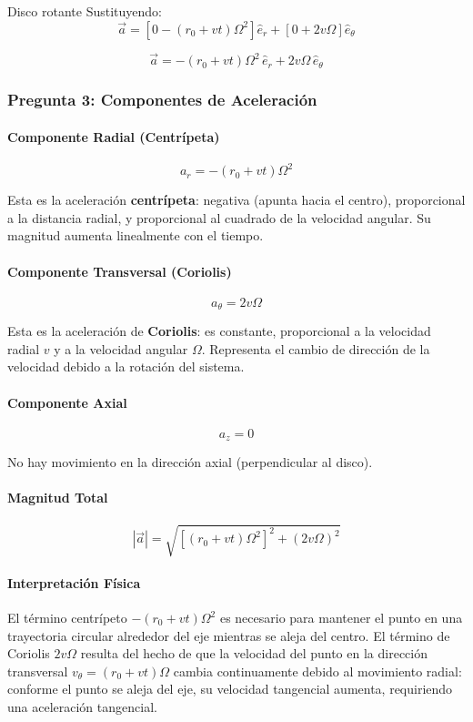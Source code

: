 \begin{solucion}{Disco rotante}
Sustituyendo:
\begin{equation}
\vec{a} = [0 - (r_0 + vt)\Omega^2] \hat{e}_r + [0 + 2v\Omega] \hat{e}_\theta
\end{equation}

\begin{equation}
\boxed{\vec{a} = -(r_0 + vt) \Omega^2 \, \hat{e}_r + 2v\Omega \, \hat{e}_\theta}
\end{equation}

\subsubsection*{Pregunta 3: Componentes de Aceleración}

\paragraph{Componente Radial (Centrípeta)}
$$a_r = -(r_0 + vt) \Omega^2$$

Esta es la aceleración \textbf{centrípeta}: negativa (apunta hacia el centro), proporcional a la distancia radial, y proporcional al cuadrado de la velocidad angular. Su magnitud aumenta linealmente con el tiempo.

\paragraph{Componente Transversal (Coriolis)}
$$a_\theta = 2v\Omega$$

Esta es la aceleración de \textbf{Coriolis}: es constante, proporcional a la velocidad radial $v$ y a la velocidad angular $\Omega$. Representa el cambio de dirección de la velocidad debido a la rotación del sistema.

\paragraph{Componente Axial}
$$a_z = 0$$

No hay movimiento en la dirección axial (perpendicular al disco).

\paragraph{Magnitud Total}
\begin{equation}
|\vec{a}| = \sqrt{[(r_0 + vt) \Omega^2]^2 + (2v\Omega)^2}
\end{equation}

\paragraph{Interpretación Física}

El término centrípeto $-(r_0 + vt) \Omega^2$ es necesario para mantener el punto en una trayectoria circular alrededor del eje mientras se aleja del centro. El término de Coriolis $2v\Omega$ resulta del hecho de que la velocidad del punto en la dirección transversal $v_\theta = (r_0 + vt) \Omega$ cambia continuamente debido al movimiento radial: conforme el punto se aleja del eje, su velocidad tangencial aumenta, requiriendo una aceleración tangencial.
\end{solucion}
